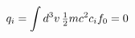 \documentclass[preview]{standalone}
\begin{document}
\begin{align*}
\special{dvisvgm:raw <g id='unique000'>}q_i=\int d^3v\,\tfrac12mc^2c_if_0=0\special{dvisvgm:raw </g>}
\end{align*}
\end{document}

